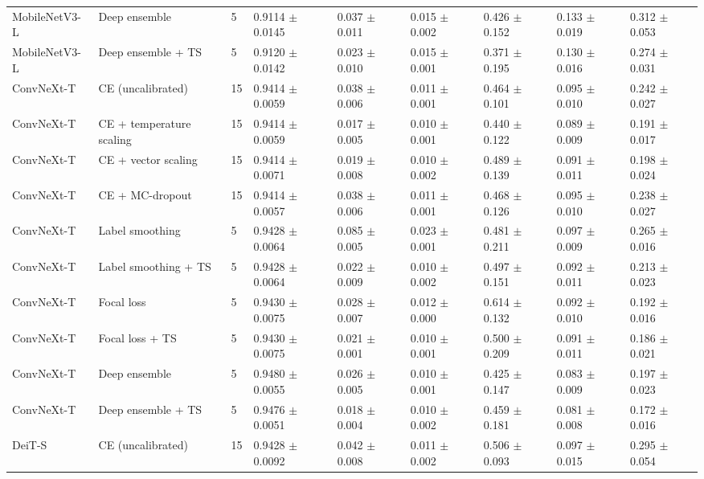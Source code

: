 \begin{table}[ht]
\begin{tabular}{lllllllll}
MobileNetV3-L & Deep ensemble & 5 & 0.9114 $\pm$ 0.0145 & 0.037 $\pm$ 0.011 & 0.015 $\pm$ 0.002 & 0.426 $\pm$ 0.152 & 0.133 $\pm$ 0.019 & 0.312 $\pm$ 0.053 \\
MobileNetV3-L & Deep ensemble + TS & 5 & 0.9120 $\pm$ 0.0142 & 0.023 $\pm$ 0.010 & 0.015 $\pm$ 0.001 & 0.371 $\pm$ 0.195 & 0.130 $\pm$ 0.016 & 0.274 $\pm$ 0.031 \\
ConvNeXt-T & CE (uncalibrated) & 15 & 0.9414 $\pm$ 0.0059 & 0.038 $\pm$ 0.006 & 0.011 $\pm$ 0.001 & 0.464 $\pm$ 0.101 & 0.095 $\pm$ 0.010 & 0.242 $\pm$ 0.027 \\
ConvNeXt-T & CE + temperature scaling & 15 & 0.9414 $\pm$ 0.0059 & 0.017 $\pm$ 0.005 & 0.010 $\pm$ 0.001 & 0.440 $\pm$ 0.122 & 0.089 $\pm$ 0.009 & 0.191 $\pm$ 0.017 \\
ConvNeXt-T & CE + vector scaling & 15 & 0.9414 $\pm$ 0.0071 & 0.019 $\pm$ 0.008 & 0.010 $\pm$ 0.002 & 0.489 $\pm$ 0.139 & 0.091 $\pm$ 0.011 & 0.198 $\pm$ 0.024 \\
ConvNeXt-T & CE + MC-dropout & 15 & 0.9414 $\pm$ 0.0057 & 0.038 $\pm$ 0.006 & 0.011 $\pm$ 0.001 & 0.468 $\pm$ 0.126 & 0.095 $\pm$ 0.010 & 0.238 $\pm$ 0.027 \\
ConvNeXt-T & Label smoothing & 5 & 0.9428 $\pm$ 0.0064 & 0.085 $\pm$ 0.005 & 0.023 $\pm$ 0.001 & 0.481 $\pm$ 0.211 & 0.097 $\pm$ 0.009 & 0.265 $\pm$ 0.016 \\
ConvNeXt-T & Label smoothing + TS & 5 & 0.9428 $\pm$ 0.0064 & 0.022 $\pm$ 0.009 & 0.010 $\pm$ 0.002 & 0.497 $\pm$ 0.151 & 0.092 $\pm$ 0.011 & 0.213 $\pm$ 0.023 \\
ConvNeXt-T & Focal loss & 5 & 0.9430 $\pm$ 0.0075 & 0.028 $\pm$ 0.007 & 0.012 $\pm$ 0.000 & 0.614 $\pm$ 0.132 & 0.092 $\pm$ 0.010 & 0.192 $\pm$ 0.016 \\
ConvNeXt-T & Focal loss + TS & 5 & 0.9430 $\pm$ 0.0075 & 0.021 $\pm$ 0.001 & 0.010 $\pm$ 0.001 & 0.500 $\pm$ 0.209 & 0.091 $\pm$ 0.011 & 0.186 $\pm$ 0.021 \\
ConvNeXt-T & Deep ensemble & 5 & 0.9480 $\pm$ 0.0055 & 0.026 $\pm$ 0.005 & 0.010 $\pm$ 0.001 & 0.425 $\pm$ 0.147 & 0.083 $\pm$ 0.009 & 0.197 $\pm$ 0.023 \\
ConvNeXt-T & Deep ensemble + TS & 5 & 0.9476 $\pm$ 0.0051 & 0.018 $\pm$ 0.004 & 0.010 $\pm$ 0.002 & 0.459 $\pm$ 0.181 & 0.081 $\pm$ 0.008 & 0.172 $\pm$ 0.016 \\
DeiT-S & CE (uncalibrated) & 15 & 0.9428 $\pm$ 0.0092 & 0.042 $\pm$ 0.008 & 0.011 $\pm$ 0.002 & 0.506 $\pm$ 0.093 & 0.097 $\pm$ 0.015 & 0.295 $\pm$ 0.054 \\

\end{tabular}
\end{table}
